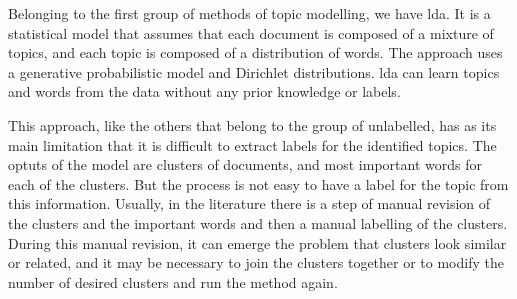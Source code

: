 Belonging to the first group of methods of topic modelling, we have \acrfull{lda}.
%
%
%
It is a statistical model that assumes that each document is composed of a mixture of topics, and each topic is composed of a distribution of words.
The approach uses a generative probabilistic model and Dirichlet distributions.
\acrshort{lda} can learn topics and words from the data without any prior knowledge or labels.




This approach, like the others that belong to the group of unlabelled, has as its main limitation that it is difficult to extract labels for the identified topics.
The optuts of the model are clusters of documents, and most important words for each of the clusters. But the process is not easy to have a label for the topic from this information. Usually, in the literature there is a step of manual revision of the clusters and the important words and then a manual labelling of the clusters.
During this manual revision, it can emerge the problem that clusters look similar or related, and it may be necessary to join the clusters together or to modify the number of desired clusters and run the method again.


